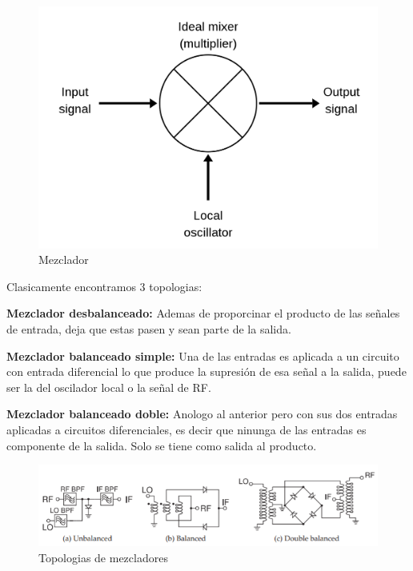 \documentclass[a4paper,12pt]{report} %
\begin{document}
\begin{figure}[H]
	\centering
	\includegraphics[scale=0.15]{Imagenes/Arquitectura/mixer}
	\caption{Mezclador}
	\label{mixer}
\end{figure}

Clasicamente encontramos 3 topologias:

\textbf{Mezclador desbalanceado:} Ademas de proporcinar el producto de las señales de entrada, deja que estas pasen y sean parte de la salida.

\textbf{Mezclador balanceado simple:} Una de las entradas es aplicada a un circuito con entrada diferencial lo que produce la supresión de esa señal a la salida, puede ser la del oscilador local o la señal de RF.

\textbf{Mezclador balanceado doble:} Anologo al anterior pero con sus dos entradas aplicadas a circuitos diferenciales, es decir que ninunga de las entradas es componente de la salida. Solo se tiene como salida al producto.

\begin{figure}[H]
	\centering
	\includegraphics[scale=0.7]{Imagenes/Arquitectura/mixer-tipos}
	\caption{Topologias de mezcladores}
	\label{mixer-tipos}
\end{figure}  

\end{document}
